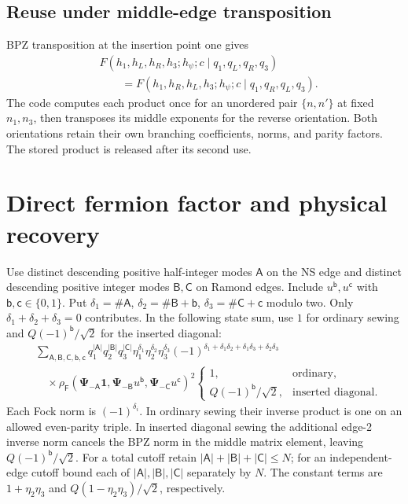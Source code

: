 \documentclass[11pt]{article}
\numberwithin{equation}{section}
\begin{document}
\subsection{Reuse under middle-edge transposition}
BPZ transposition at the insertion point one gives
\begin{align}
 &F(h_1,h_L,h_R,h_3;h_\psi;c\mid q_1,q_L,q_R,q_3)\nonumber\\
 &\qquad=F(h_1,h_R,h_L,h_3;h_\psi;c\mid q_1,q_R,q_L,q_3).
\end{align}
The code computes each product once for an unordered pair $\{n,n'\}$ at
fixed $n_1,n_3$, then transposes its middle exponents for the reverse orientation.
Both orientations retain their own branching coefficients, norms, and parity
factors. The stored product is released after its second use.

\section{Direct fermion factor and physical recovery}
\label{sec:fermion}

Use distinct descending positive half-integer modes $\mathsf A$ on the NS
edge and distinct descending positive integer modes $\mathsf B,\mathsf C$
on Ramond edges. Include $u^{\mathsf b},u^{\mathsf c}$ with
$\mathsf b,\mathsf c\in\{0,1\}$. Put
$\delta_1=\#\mathsf A$, $\delta_2=\#\mathsf B+\mathsf b$,
$\delta_3=\#\mathsf C+\mathsf c$ modulo two.
Only $\delta_1+\delta_2+\delta_3=0$ contributes. In the following state sum,
use $1$ for ordinary sewing and $Q(-1)^{\mathsf b}/\sqrt2$ for the inserted
diagonal:
\begin{align}
 &\sum_{\mathsf A,\mathsf B,\mathsf C,\mathsf b,\mathsf c}
 q_1^{|\mathsf A|}q_2^{|\mathsf B|}q_3^{|\mathsf C|}
 \eta_1^{\delta_1}\eta_2^{\delta_2}\eta_3^{\delta_3}
 (-1)^{\delta_1+\delta_1\delta_2+\delta_1\delta_3+\delta_2\delta_3}
 \nonumber\\[-2pt]
 &\quad\times
 \rho_{\mathsf F}(\boldsymbol\Psi_{-\mathsf A}\mathbf1,
                  \boldsymbol\Psi_{-\mathsf B}u^{\mathsf b},
                  \boldsymbol\Psi_{-\mathsf C}u^{\mathsf c})^2
 \begin{cases}1,&\text{ordinary},\\Q(-1)^{\mathsf b}/\sqrt2,&\text{inserted diagonal}.
 \end{cases}
 \label{eq:fermion-sum}
\end{align}
Each Fock norm is $(-1)^{\delta_i}$. In ordinary sewing their inverse
product is one on an allowed even-parity triple. In inserted diagonal sewing
the additional edge-2 inverse norm cancels the BPZ norm in the middle matrix
element, leaving $Q(-1)^{\mathsf b}/\sqrt2$.
For a total cutoff retain $|\mathsf A|+|\mathsf B|+|\mathsf C|\le N$;
for an independent-edge cutoff bound each of $|\mathsf A|,|\mathsf B|,
|\mathsf C|$ separately by $N$.
The constant terms are $1+\eta_2\eta_3$ and
$Q(1-\eta_2\eta_3)/\sqrt2$, respectively.
\end{document}
